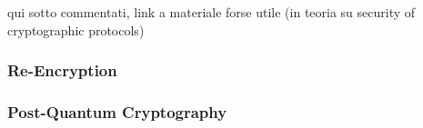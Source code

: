 qui sotto commentati, link a materiale forse utile (in teoria su security of cryptographic protocols)



\subsubsection{Re-Encryption}\label{future_sec:re_encryption}


\subsubsection{Post-Quantum Cryptography}\label{future_sec:post_quantum_cryptography}



